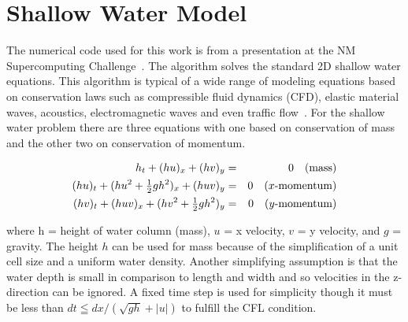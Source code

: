 \section{Shallow Water Model}
\label{sec:shallow-water}

The numerical code used for this work is from a presentation at the NM
Supercomputing Challenge~\citep{Robey07}.  The algorithm solves the
standard 2D shallow water equations. This algorithm is typical of a
wide range of modeling equations based on conservation laws such as
compressible fluid dynamics (CFD), elastic material waves, acoustics,
electromagnetic waves and even traffic flow~\citep{Leveque02}. For the
shallow water problem there are three equations with one based on
conservation of mass and the other two on conservation of momentum.

\begin{eqnarray*}
h_{t}+(hu)_{x}+(hv)_{y} & = & 0\quad\mbox{(mass)}\\
(hu)_{t}+(h{u}^{2}+\tfrac{1}{2}gh^{2})_{x}+(huv)_{y} & = & 0\mbox{\quad($x$-momentum)}\\
(hv)_{t}+(huv)_{x}+(h{v}^{2}+\tfrac{1}{2}gh^{2})_{y} & = & 0\mbox{\quad($y$-momentum)}
\end{eqnarray*}



\noindent
where h = height of water column (mass), $u$ = x velocity, $v$ =
y velocity, and $g$ = gravity. The height $h$ can be used for mass
because of the simplification of a unit cell size and a uniform water
density. Another simplifying assumption is that the water depth is
small in comparison to length and width and so velocities in the z-direction
can be ignored. A fixed time step is used for simplicity though it
must be less than $dt \leqq dx / (\sqrt{gh}+|u|)$ to fulfill the CFL
condition.

